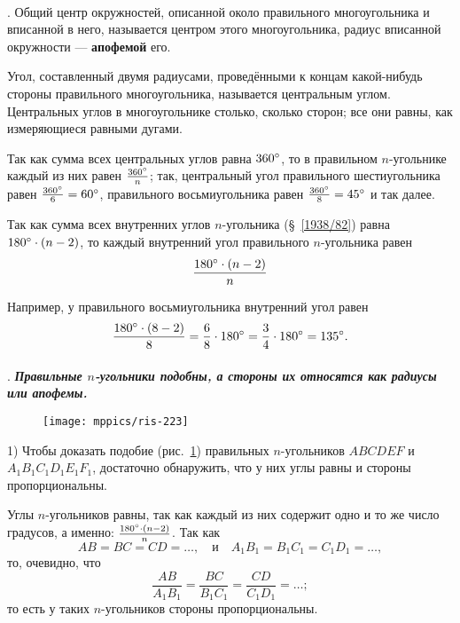 \paragraph{}\label{1938/217}
.
Общий центр окружностей, описанной около правильного многоугольника и вписанной в него, называется центром этого многоугольника, радиус вписанной окружности — \textbf{апофемой} его.

Угол, составленный двумя радиусами, проведёнными к концам какой-нибудь стороны правильного многоугольника, называется центральным углом.
Центральных углов в многоугольнике столько, сколько сторон;
все они равны, как измеряющиеся равными дугами.

Так как сумма всех центральных углов равна $360\degree$, то в правильном $n$-угольнике каждый из них равен $\tfrac{360\degree}n$;
так, центральный угол правильного шестиугольника равен $\tfrac{360\degree}6\z=60\degree$, правильного восьмиугольника равен $\tfrac{360\degree}8 = 45\degree$ и так далее.

Так как сумма всех внутренних углов $n$-угольника (§~\ref{1938/82}) равна $180\degree\cdot(n-2)$, то каждый внутренний угол правильного $n$-угольника равен
\[\frac{180\degree\cdot(n-2)}{n}\]

Например, у правильного восьмиугольника внутренний угол равен
\[\frac{180\degree\cdot(8-2)}{8}=\frac{6}{8}\cdot 180\degree=\frac{3}{4}\cdot 180\degree=135\degree.\]

\paragraph{}\label{1938/218}
.
\textbf{\emph{Правильные $n$-угольники подобны, а стороны их относятся как радиусы или апофемы.}}

\begin{figure}[h!]
\centering
\texttt{[image: mppics/ris-223]}
\caption{}\label{1938/ris-223}
\end{figure}

1) Чтобы доказать подобие (рис.~\ref{1938/ris-223}) правильных $n$-угольников $ABCDEF$ и $A_1B_1C_1D_1E_1F_1$, достаточно обнаружить, что у них углы равны и стороны пропорциональны.

Углы $n$-угольников равны, так как каждый из них содержит одно и то же число градусов, а именно: $\frac{180\degree\cdot(n-2)}{n}$.
Так как 
\[AB=BC = CD=\dots,
\quad\text{и}\quad A_1B_1=B_1C_1 = C_1D_1=\dots,\]
то, очевидно, что
\[\frac{AB}{A_1B_1}=\frac{BC}{B_1C_1} = \frac{CD}{C_1D_1}=\dots;\]
то есть у таких $n$-угольников стороны пропорциональны.

